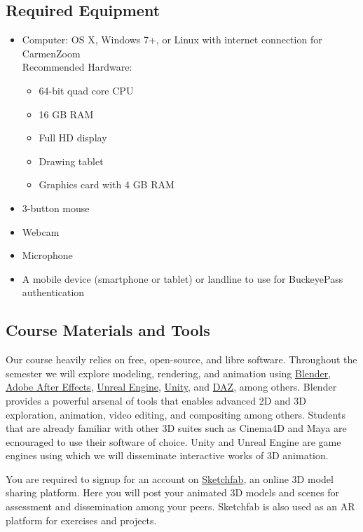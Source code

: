 \subsection{Required Equipment}

\begin{itemize}
      \tightlist
      \item Computer: OS X, Windows 7+, or Linux with internet connection for CarmenZoom\\
            Recommended Hardware:
            \begin{itemize}
                  \item 64-bit quad core CPU
                  \item 16 GB RAM
                  \item Full HD display
                  \item Drawing tablet
                  \item Graphics card with 4 GB RAM
            \end{itemize}
      \item 3-button mouse
      \item Webcam
      \item Microphone
      \item A mobile device (smartphone or tablet) or landline to use for BuckeyePass authentication
\end{itemize}

\subsection{Course Materials and Tools}

Our course heavily relies on free, open-source, and libre software. Throughout the semester we will explore modeling, rendering, and animation using \href{http://blender.org/}{Blender}, \href{https://www.adobe.com/products/aftereffects.html}{Adobe After Effects}, \href{https://www.unrealengine.com/en-US/}{Unreal Engine}, \href{https://unity.com/}{Unity}, and \href{https://www.daz3d.com/}{DAZ}, among others. Blender provides a powerful arsenal of tools that enables advanced 2D and 3D exploration, animation, video editing, and compositing among others. Students that are already familiar with other 3D suites such as Cinema4D and Maya are ecnouraged to use their software of choice. Unity and Unreal Engine are game engines using which we will disseminate interactive works of 3D animation.

You are required to signup for an account on \href{http://sketchfab.com}{Sketchfab}, an online 3D model sharing platform. Here you will post your animated 3D models and scenes for assessment and dissemination among your peers. Sketchfab is also used as an AR platform for exercises and projects.

